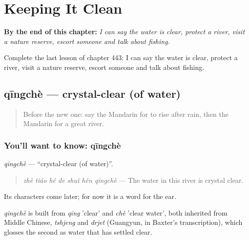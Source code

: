 
\chapter{Keeping It Clean}
\label{ch:zh-keeping-it-clean}

\begin{chapteropening}
\textbf{By the end of this chapter:} \emph{I can say the water is clear, protect a river, visit a nature reserve, escort someone and talk about fishing.}

Complete the last lesson of chapter 443: I can say the water is clear, protect a river, visit a nature reserve, escort someone and talk about fishing.
\end{chapteropening}

\section[qīngchè]{qīngchè — crystal-clear (of water)}

\label{lesson:ZH-C443-qingche}



\begin{quote}
Before the new one: say the Mandarin for to rise after rain, then the Mandarin for a great river.
\end{quote}

\subsection*{You'll want to know: qīngchè}
\emph{qīngchè} — \textquotedblleft{}crystal-clear (of water)\textquotedblright{}.

\begin{quote}
\emph{zhè tiáo hé de shuǐ hěn qīngchè} — The water in this river is crystal clear.
\end{quote}

Its characters come later; for now it is a word for the ear.

\begin{cousinweb}
\emph{qīngchè} is built from \emph{qīng} 'clear' and \emph{chè} 'clear water', both inherited from Middle Chinese, \emph{tshjeng} and \emph{drjet} (Guangyun, in Baxter's transcription), which glosses the second as water that has settled clear.
\end{cousinweb}

